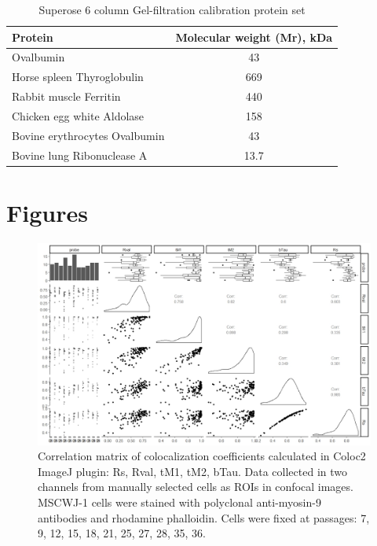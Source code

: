 \documentclass[num-refs]{wiley-article}
\begin{document}
\begin{table}[hbt!]
  \caption{Superose 6 column Gel-filtration calibration protein set}
  \label{calibration}
\centering
\begin{tabular}{l|c|}
 Protein & Molecular weight (Mr), kDa  \\
 \hline
 Ovalbumin & 43 \\
 Horse spleen Thyroglobulin & 669 \\
 Rabbit muscle Ferritin & 440 \\
 Chicken egg white Aldolase & 158 \\
 Bovine erythrocytes Ovalbumin & 43 \\
 Bovine lung Ribonuclease A & 13.7
\end{tabular}
\begin{tablenotes}
\item
\end{tablenotes}
\end{table}

\section{Figures}

\begin{figure}[hbt!]
  \includegraphics[width=1\linewidth]{supp1.jpeg}
  \caption{Correlation matrix of colocalization coefficients calculated in Coloc2 ImageJ plugin: Rs, Rval, tM1, tM2, bTau. Data collected in two channels from manually selected cells as ROIs in confocal images. MSCWJ-1 cells were stained with polyclonal anti-myosin-9 antibodies and rhodamine phalloidin. Cells were fixed at passages: 7, 9, 12, 15, 18, 21, 25, 27, 28, 35, 36.}
  \centering
\end{figure}
\end{document}
